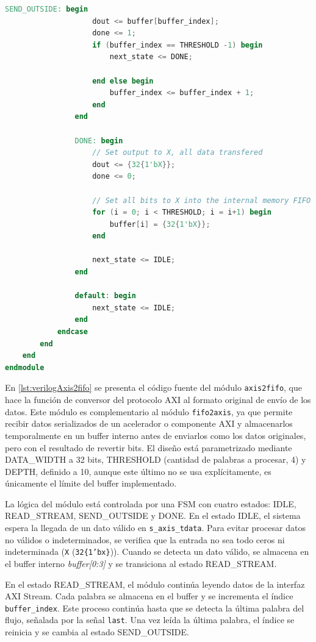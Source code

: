 \begin{adjustwidth}{1.5cm}{}
\begin{lstlisting}[language=verilog,frame=single,caption={Código fuente en Verilog del módulo conversor de AXI al formato de datos origen},showstringspaces=false,label=lst:verilogAxis2fifo]
                SEND_OUTSIDE: begin
                    dout <= buffer[buffer_index];
                    done <= 1;
                    if (buffer_index == THRESHOLD -1) begin
                        next_state <= DONE;
                        
                    end else begin
				        buffer_index <= buffer_index + 1;
                    end
                end
                
                DONE: begin
                    // Set output to X, all data transfered
                    dout <= {32{1'bX}};
                    done <= 0;
                    
                    // Set all bits to X into the internal memory FIFO
                    for (i = 0; i < THRESHOLD; i = i+1) begin
                        buffer[i] = {32{1'bX}}; 
                    end
                    
                    next_state <= IDLE;
                end

                default: begin
                    next_state <= IDLE;
                end
            endcase
        end
    end
endmodule
\end{lstlisting}

En \ref{lst:verilogAxis2fifo} se presenta el código fuente del módulo \texttt{axis2fifo}, que hace la función de conversor del protocolo AXI al formato original de envío de los datos. Este módulo es complementario al módulo \texttt{fifo2axis}, ya que permite recibir datos serializados de un acelerador o componente AXI y almacenarlos temporalmente en un buffer interno antes de enviarlos como los datos originales, pero con el resultado de revertir bits. El diseño está parametrizado mediante DATA\_WIDTH a 32 bits, THRESHOLD (cantidad de palabras a procesar, 4) y DEPTH, definido a  10, aunque este último no se usa explícitamente, es únicamente el límite del buffer implementado.

La lógica del módulo está controlada por una FSM con cuatro estados: IDLE, READ\_STREAM, SEND\_OUTSIDE y DONE. En el estado IDLE, el sistema espera la llegada de un dato válido en \texttt{s\_axis\_tdata}. Para evitar procesar datos no válidos o indeterminados, se verifica que la entrada no sea todo ceros ni indeterminada (\texttt{X} (\texttt{{32\{1'bx\}}})). Cuando se detecta un dato válido, se almacena en el buffer interno \emph{buffer[0:3]} y se transiciona al estado READ\_STREAM.

En el estado READ\_STREAM, el módulo continúa leyendo datos de la interfaz AXI Stream. Cada palabra se almacena en el buffer y se incrementa el índice \texttt{buffer\_index}. Este proceso continúa hasta que se detecta la última palabra del flujo, señalada por la señal \texttt{last}. Una vez leída la última palabra, el índice se reinicia y se cambia al estado SEND\_OUTSIDE.


\end{adjustwidth}
